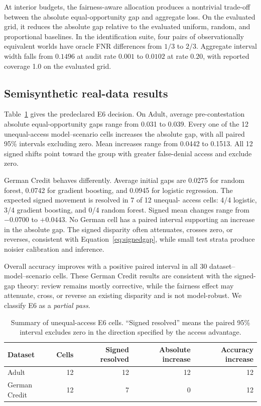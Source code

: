 \documentclass[manuscript,screen,review]{jair}
\begin{document}
At interior budgets, the fairness-aware allocation produces a nontrivial
trade-off between the absolute equal-opportunity gap and aggregate loss.  On
the evaluated grid, it reduces the absolute gap relative to the evaluated
uniform, random, and proportional baselines.  In the
identification suite, four pairs of observationally equivalent worlds have
oracle FNR differences from $1/3$ to $2/3$.  Aggregate interval width falls
from $0.1496$ at audit rate $0.001$ to $0.0102$ at rate $0.20$, with reported
coverage 1.0 on the evaluated grid.

\subsection{Semisynthetic real-data results}

Table~\ref{tab:e6} gives the predeclared E6 decision.  On Adult, average
pre-contestation absolute equal-opportunity gaps range from 0.031 to 0.039.  Every one
of the 12 unequal-access model--scenario cells increases the absolute gap,
with all paired 95\% intervals excluding zero.  Mean increases range from
0.0442 to 0.1513.  All 12 signed shifts point toward the group with greater
false-denial access and exclude zero.

German Credit behaves differently.  Average initial gaps are 0.0275 for
random forest, 0.0742 for gradient boosting, and 0.0945 for logistic
regression.  The expected signed movement is resolved in 7 of 12 unequal-
access cells: 4/4 logistic, 3/4 gradient boosting, and 0/4 random forest.
Signed mean changes range from $-0.0700$ to $+0.0443$.  No German cell has a
paired interval supporting an increase in the absolute gap.  The signed
disparity often attenuates, crosses zero, or reverses, consistent with
Equation~\eqref{eq:signedgap}, while small test strata produce noisier
calibration and inference.

Overall accuracy improves with a positive paired interval in all 30 dataset--
model--scenario cells.  These German Credit results are consistent with the
signed-gap theory: review remains mostly corrective, while the fairness effect
may attenuate, cross, or reverse an existing disparity and is not
model-robust.  We classify E6 as a \emph{partial pass}.

\begin{table}[t]
\centering
\caption{Summary of unequal-access E6 cells. ``Signed resolved'' means the
paired 95\% interval excludes zero in the direction specified by the access
advantage.}
\label{tab:e6}
\begin{tabular}{lrrrr}
\toprule
Dataset & Cells & Signed resolved & Absolute increase & Accuracy increase\\
\midrule
Adult & 12 & 12 & 12 & 12\\
German Credit & 12 & 7 & 0 & 12\\
\bottomrule
\end{tabular}
\end{table}
\end{document}
